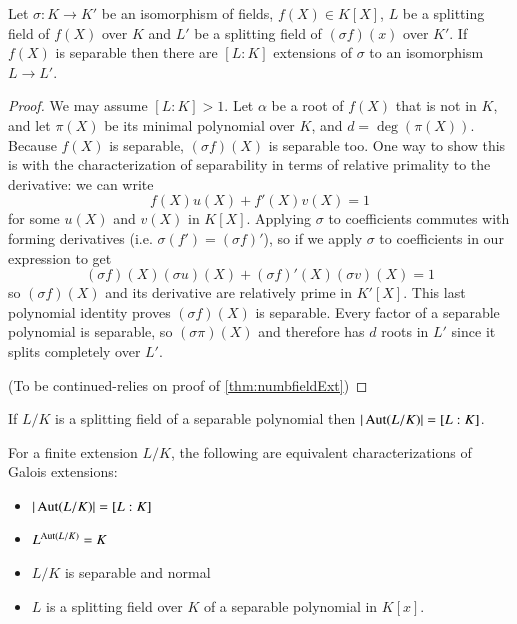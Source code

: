\documentclass[12pt, a4paper, oneside, openright, titlepage]{book}
\begin{document}
\begin{thm}
    Let $\sigma:K\rightarrow K'$ be an isomorphism of fields, $f(X) \in K[X]$, $L$ be a splitting field of $f(X)$ over $K$ and $L'$ be a splitting field of $(\sigma f)(x)$ over $K'$. If $f(X)$ is separable then there are $[L:K]$ extensions of $\sigma$ to an isomorphism $L\rightarrow L'$.
\end{thm}
\begin{proof}
    We may assume $[L:K] > 1$. Let $\alpha$ be a root of $f(X)$ that is not in $K$, and let $\pi(X)$ be its minimal polynomial over $K$, and $d = \deg(\pi(X))$. Because $f(X)$ is separable, $(\sigma f)(X)$ is separable too. One way to show this is with the characterization of separability in terms of relative primality to the derivative: we can write \begin{equation*}
        f(X)u(X) + f'(X)v(X) = 1
    \end{equation*}
    for some $u(X)$ and $v(X)$ in $K[X]$. Applying $\sigma$ to coefficients commutes with forming derivatives (i.e. $\sigma(f') = (\sigma f)'$), so if we apply $\sigma$ to coefficients in our expression to get \begin{equation*}
        (\sigma f)(X)(\sigma u)(X)+(\sigma f)'(X)(\sigma v)(X) = 1
    \end{equation*}
    so $(\sigma f)(X)$ and its derivative are relatively prime in $K'[X]$. This last polynomial identity proves $(\sigma f)(X)$ is separable. Every factor of a separable polynomial is separable, so $(\sigma \pi)(X)$ and therefore has $d$ roots in $L'$ since it splits completely over $L'$.

    (To be continued-relies on proof of \ref{thm:numbfieldExt})
\end{proof}



\begin{cor}
    If $L/K$ is a splitting field of a separable polynomial then $|\operatorname{Aut}(L/K)| = [L:K]$.
\end{cor}


\begin{thm}
    For a finite extension $L/K$, the following are equivalent characterizations of Galois extensions: \begin{itemize}
        \item $|\operatorname{Aut}(L/K)| = [L:K]$
        \item $L^{\operatorname{Aut}(L/K)} = K$
        \item $L/K$ is separable and normal
        \item $L$ is a splitting field over $K$ of a separable polynomial in $K[x]$.
    \end{itemize}
\end{thm}
\end{document}
